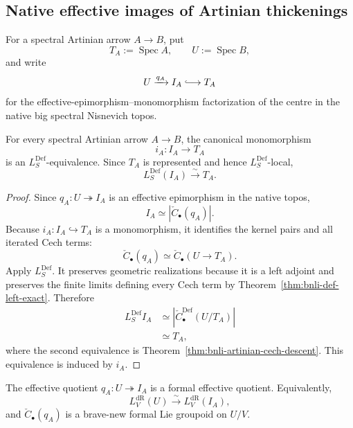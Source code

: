 \subsection{Native effective images of Artinian thickenings}

For a spectral Artinian arrow $A\to B$, put
\[
    T_A:=\operatorname{Spec}A,
    \qquad
    U:=\operatorname{Spec}B,
\]
and write
\[
    U\xrightarrow{q_A}I_A\lhook\joinrel\longrightarrow T_A
\]
for the effective-epimorphism--monomorphism factorization of the centre in the
native big spectral Nisnevich topos.

\begin{corollary}
\label{cor:bnli-artinian-effective-image-def}
For every spectral Artinian arrow $A\to B$, the canonical monomorphism
\[
    i_A:I_A\longrightarrow T_A
\]
is an $L_S^{\mathrm{Def}}$-equivalence.  Since $T_A$ is represented and hence
$L_S^{\mathrm{Def}}$-local,
\[
\boxed{
    L_S^{\mathrm{Def}}(I_A)
    \xrightarrow{\sim}
    T_A.}
\]
\end{corollary}

\begin{proof}
Since $q_A:U\twoheadrightarrow I_A$ is an effective epimorphism in the native
topos,
\[
    I_A\simeq|\check C_\bullet(q_A)|.
\]
Because $i_A:I_A\hookrightarrow T_A$ is a monomorphism, it identifies the
kernel pairs and all iterated Cech terms:
\[
    \check C_\bullet(q_A)
    \simeq
    \check C_\bullet(U\to T_A).
\]
Apply $L_S^{\mathrm{Def}}$.  It preserves geometric realizations because it is
a left adjoint and preserves the finite limits defining every Cech term by
Theorem~\ref{thm:bnli-def-left-exact}.  Therefore
\[
\begin{aligned}
    L_S^{\mathrm{Def}}I_A
    &\simeq
    \left|
      \check C_\bullet^{\mathrm{Def}}(U/T_A)
    \right|\\
    &\simeq T_A,
\end{aligned}
\]
where the second equivalence is Theorem~\ref{thm:bnli-artinian-cech-descent}.
This equivalence is induced by $i_A$.
\end{proof}

\begin{proposition}
\label{prop:bnli-artinian-cell-formal}
The effective quotient $q_A:U\twoheadrightarrow I_A$ is a formal effective
quotient.  Equivalently,
\[
    L_V^{\mathrm{dR}}(U)
    \xrightarrow{\sim}
    L_V^{\mathrm{dR}}(I_A),
\]
and $\check C_\bullet(q_A)$ is a brave-new formal Lie groupoid on $U/V$.
\end{proposition}

